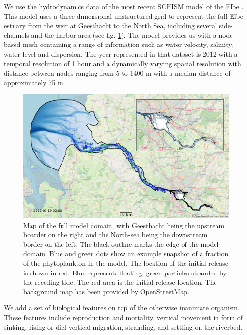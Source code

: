 \documentclass[npg, manuscript]{copernicus}
\begin{document}
We use the hydrodynamics data of the most recent SCHISM model of the Elbe \citep{Pein2021}.
This model uses a three-dimensional unstructured  grid to represent the full Elbe estuary from the weir at Geesthacht to the North Sea, including several side-channels and the harbor area (see fig. \ref{fig:model_domain}). 
The model provides us with a node-based mesh containing a range of information such as water velocity, salinity, water level and dispersion.
The year represented in that dataset is 2012 with a temporal resolution of 1 hour and a dynamically varying spacial resolution with distance between nodes ranging from 5 to 1400 \unit{m} with a median distance of approximately 75 \unit{m}.

\begin{figure}
    \includegraphics[width=12cm]{model_domain_wcopyright.png}
    \caption{Map of the full model domain, with Geesthacht being the upstream boarder on the right and the North-sea being the downstream border on the left. The black outline marks the edge of the model domain. Blue and green dots show an example snapshot of a fraction of the phytoplankton in the model. The location of the initial release is shown in red. Blue represents floating, green particles stranded by the receding tide. The red area is the initial release location. The background map has been provided by OpenStreetMap.}
    \label{fig:model_domain}
\end{figure}

We add a set of biological features on top of the otherwise inanimate organism.
These features include reproduction and mortality, vertical movement in form of sinking, rising or diel vertical migration, stranding, and settling on the riverbed.
\end{document}
